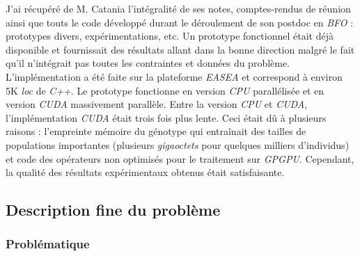 \documentclass[french, 11pt]{memoir}
\begin{document}
\bigskip
J'ai récupéré de M. Catania
l'intégralité de ses notes, comptes-rendus de réunion ainsi que touts le
code développé durant le déroulement de son postdoc en \textit{BFO} :
prototypes divers, expérimentations, etc. Un prototype fonctionnel était
déjà disponible et fournissait des résultats allant dans la bonne
direction malgré le fait qu'il n'intégrait pas toutes les contraintes et
données du problème. \\
L'implémentation a été faite sur la plateforme
\emph{EASEA} et correspond à environ 5K \emph{loc} de \emph{C++}. Le
prototype fonctionne en version \emph{CPU} parallélisée et en version
\emph{CUDA} massivement parallèle. Entre la version \emph{CPU} et
\emph{CUDA}, l'implémentation \textit{CUDA} était trois fois plus lente. Ceci
était dû à plusieurs raisons : l'empreinte mémoire du génotype qui
entraînait des tailles de populations importantes (plusieurs
\emph{gigaoctets} pour quelques milliers d'individus) et code des
opérateurs non optimisés pour le traitement sur \textit{GPGPU}. Cependant, la
qualité des résultats expérimentaux obtenus était satisfaisante.

\subsection{Description fine du
problème}\label{description-fine-du-probluxe8me}

\subsubsection{Problématique}\label{probluxe9matique}
\end{document}
